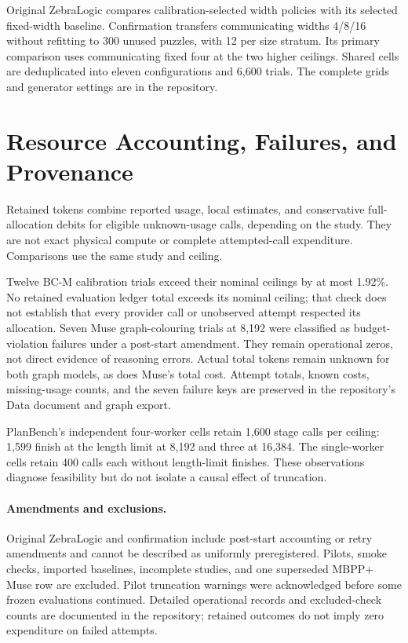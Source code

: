 Original ZebraLogic compares calibration-selected width policies with its
selected fixed-width baseline. Confirmation transfers communicating widths
4/8/16 without refitting to 300 unused puzzles, with 12 per size stratum.
Its primary comparison uses communicating fixed four at the two higher
ceilings. Shared cells are deduplicated into eleven configurations and
6,600 trials. The complete grids and generator settings are in the repository.

\section{Resource Accounting, Failures, and Provenance}
\label{app:accounting}
Retained tokens combine reported usage, local estimates, and conservative
full-allocation debits for eligible unknown-usage calls, depending on the
study. They are not exact physical compute or complete attempted-call
expenditure. Comparisons use the same study and ceiling.

Twelve BC-M calibration trials exceed their nominal ceilings by at most
1.92\%. No retained evaluation ledger total exceeds its nominal ceiling;
that check does not establish that every provider call or unobserved attempt
respected its allocation. Seven Muse graph-colouring trials at 8,192 were
classified as budget-violation failures under a post-start amendment.
They remain operational zeros, not direct evidence of reasoning errors.
Actual total tokens remain unknown for both graph models, as does Muse's
total cost. Attempt totals, known costs, missing-usage counts, and the seven
failure keys are preserved in the repository's Data document and graph export.

PlanBench's independent four-worker cells retain 1,600 stage calls per
ceiling: 1,599 finish at the length limit at 8,192 and three at 16,384.
The single-worker cells retain 400 calls each without length-limit finishes.
These observations diagnose feasibility but do not isolate a causal effect
of truncation.

\paragraph{Amendments and exclusions.}
Original ZebraLogic and confirmation include post-start accounting or retry
amendments and cannot be described as uniformly preregistered. Pilots,
smoke checks, imported baselines, incomplete studies, and one superseded
MBPP+ Muse row are excluded. Pilot truncation warnings were acknowledged
before some frozen evaluations continued. Detailed operational records and
excluded-check counts are documented in the repository; retained outcomes
do not imply zero expenditure on failed attempts.

